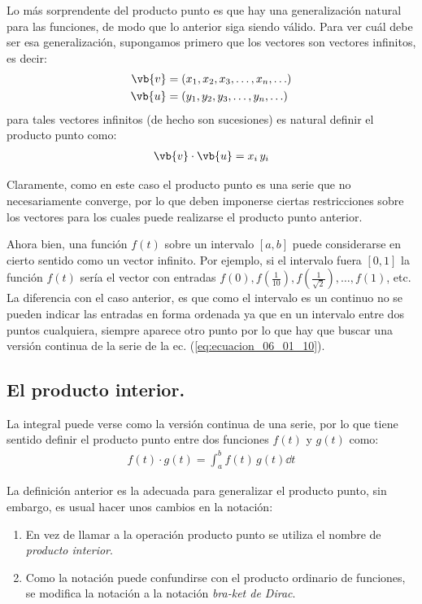 Lo más sorprendente del producto punto es que hay una generalización natural para las funciones, de modo que lo anterior siga siendo válido. Para ver cuál debe ser esa generalización, supongamos primero que los vectores son vectores infinitos, es decir:
\begin{align}
\begin{aligned}
\vb{v} &= (x_{1}, x_{2}, x_{3}, \ldots, x_{n}, \ldots) \\
\vb{u} &= (y_{1}, y_{2}, y_{3}, \ldots, y_{n}, \ldots)
\end{aligned}
\label{eq:ecuacion_06_01_09}
\end{align}
para tales vectores infinitos (de hecho son sucesiones) es natural definir el producto punto como:
\begin{align}
\vb{v} \cdot \vb{u} = x_{i} \, y_{i}
\label{eq:ecuacion_06_01_10}
\end{align}

Claramente, como en este caso el producto punto es una serie que no necesariamente converge, por lo que deben imponerse ciertas restricciones sobre los vectores para los cuales puede realizarse el producto punto anterior. 
\par
Ahora bien, una función $f(t)$ sobre un intervalo $[a, b]$ puede considerarse en cierto sentido como un vector infinito. Por ejemplo, si el intervalo fuera $[0, 1]$ la función $f(t)$ sería el vector con entradas $f(0), f(\frac{1}{10}), f(\frac{1}{\sqrt{2}}), \ldots, f(1)$, etc. La diferencia con el caso anterior, es que como el intervalo es un continuo no se pueden indicar las entradas en forma ordenada ya que en un intervalo entre dos puntos cualquiera, siempre aparece otro punto por lo que hay que buscar una versión continua de la serie de la ec. (\ref{eq:ecuacion_06_01_10}). 

\subsection{El producto interior.}

La integral puede verse como la versión continua de una serie, por lo que tiene sentido definir el producto punto entre dos funciones $f(t)$ y $g(t)$ como:
\begin{align}
f(t) \cdot g(t) = \int_{a}^{b} f(t) \, g(t) \dd{t}
\label{eq:ecuacion_06_01_11}
\end{align}

La definición anterior es la adecuada para generalizar el producto punto, sin embargo, es usual hacer unos cambios en la notación:
\begin{enumerate}
\item En vez de llamar a la operación producto punto se utiliza el nombre de \emph{producto interior}.
\item Como la notación puede confundirse con el producto ordinario de funciones, se modifica la notación a la notación \emph{bra-ket de Dirac}. 
\end{enumerate}

